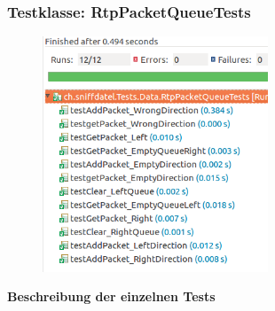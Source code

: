 \documentclass[a4,12pt]{scrartcl}
\begin{document}
\subsubsection{Testklasse: RtpPacketQueueTests}
\begin{figure} [H]
	\begin{center}
	\includegraphics[width=0.60\textwidth]{./pictures/RtpPacketQueueTests.png}
	\label{Bild Referenz}
	\end{center}
\end{figure}
\textbf{Beschreibung der einzelnen Tests}
\end{document}
